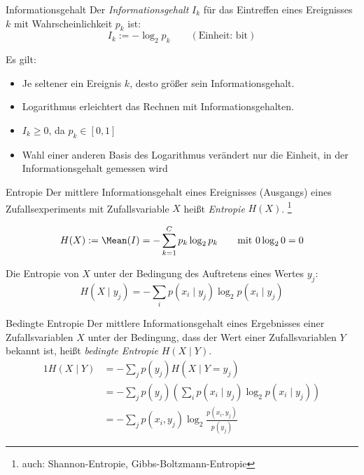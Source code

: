 \begin{defi}{Informationsgehalt}
    Der \emph{Informationsgehalt} $I_k$ für das Eintreffen eines Ereignisses $k$ mit Wahrscheinlichkeit $p_k$ ist:
    \[
        I_k := - \log_2 p_k \qquad (\text{Einheit: bit})
    \]

    Es gilt:
    \begin{itemize}
        \item Je seltener ein Ereignis $k$, desto größer sein Informationsgehalt.
        \item Logarithmus erleichtert das Rechnen mit Informationsgehalten.
        \item $I_k \geq 0$, da $p_k \in [0, 1]$
        \item Wahl einer anderen Basis des Logarithmus verändert nur die Einheit, in der Informationsgehalt gemessen wird
    \end{itemize}
\end{defi}

\begin{defi}{Entropie}
    Der mittlere Informationsgehalt eines Ereignisses (Ausgangs) eines Zufallsexperiments mit Zufallsvariable $X$ heißt \emph{Entropie} $H(X)$.
    \footnote{auch: Shannon-Entropie, Gibbs-Boltzmann-Entropie}

    \[
        H(X) := \Mean(I) = - \sum_{k=1}^C p_k \log_2 p_k \qquad \text{mit} \ 0 \log_2 0 = 0
    \]

    Die Entropie von $X$ unter der Bedingung des Auftretens eines Wertes $y_j$:
    \[
        H(X \mid y_j) = - \sum_{i} p(x_i \mid y_j) \log_2 p(x_i \mid y_j)
    \]
\end{defi}

\begin{defi}{Bedingte Entropie}
    Der mittlere Informationsgehalt eines Ergebnisses einer Zufallsvariablen $X$ unter der Bedingung, dass der Wert einer Zufallsvariablen $Y$ bekannt ist, heißt \emph{bedingte Entropie} $H(X \mid Y)$.
    \begin{alignat*}{1}
        H(X \mid Y) & = - \sum_{j} p(y_j) H(X \mid Y = y_j)                                              \\
                    & = - \sum_{j} p(y_j) \left( \sum_{i} p(x_i \mid y_j) \log_2 p(x_i \mid y_j) \right) \\
                    & = - \sum_{j} p(x_i, y_j) \log_2 \frac{p(x_i, y_j)}{p(y_j)}
    \end{alignat*}
\end{defi}

